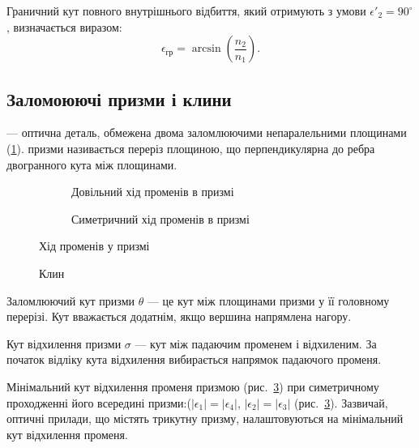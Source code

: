 Граничний кут
повного внутрішнього відбиття, який отримують з умови $\epsilon'_2 = 90^\circ$,
визначається виразом:
\begin{equation}\label{eq:total reflection}
	\epsilon_\text{гр} = \arcsin\left(\frac{n_2}{n_1}\right).
\end{equation}

\subsection*{Заломоюючі призми і клини}


 --- оптична деталь, обмежена двома заломлюючими непаралельними
площинами (\ref{pic:prism}).  призми називається переріз площиною, що перпендикулярна до ребра двогранного кута між площинами.

\begin{figure}[h!]\centering
    \begin{subfigure}{.47\linewidth}\centering
        
        \caption{Довільний хід променів в призмі}
        \label{pic:prism}
    \end{subfigure}
    \quad
    \begin{subfigure}{.47\linewidth}\centering
        
        \caption{Симетричний хід променів в призмі}
        \label{pic:prism_min}
    \end{subfigure}
    \caption{Хід променів у призмі}
\end{figure}



\begin{wrapfigure}{O}{0.33\linewidth}\centering
    
    \caption{Клин}
    \label{pic:klin}
\end{wrapfigure}
Заломлюючий кут призми $\theta$ --- це кут між площинами призми у її головному перерізі. Кут вважається додатнім, якщо вершина напрямлена нагору.

Кут відхилення призми  $\sigma$ --- кут між падаючим променем і відхиленим. За початок відліку кута відхилення вибирається напрямок падаючого променя.


Мінімальний кут відхилення променя призмою (рис.~\ref{pic:prism_min}) при
симетричному проходженні його всередині призми:($|\epsilon_1| = |\epsilon_4|$, $|\epsilon_2| = |\epsilon_3|$ (рис.~\ref{pic:prism_min}). Зазвичай, оптичні прилади, що містять трикутну призму, налаштовуються на мінімальний кут відхилення променя.

